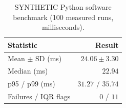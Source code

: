 \begin{table}[t]
  \centering
  \caption{SYNTHETIC Python software benchmark (100 measured runs, milliseconds).}
  \label{tab:software}
  \begin{tabular}{@{}lr@{}}
    \toprule
    Statistic & Result \\
    \midrule
    Mean $\pm$ SD (ms) & $24.06\pm3.30$ \\
    Median (ms) & $22.94$ \\
    p95 / p99 (ms) & $31.27$ / $35.74$ \\
    Failures / IQR flags & $0$ / $11$ \\
    \bottomrule
  \end{tabular}
\end{table}
